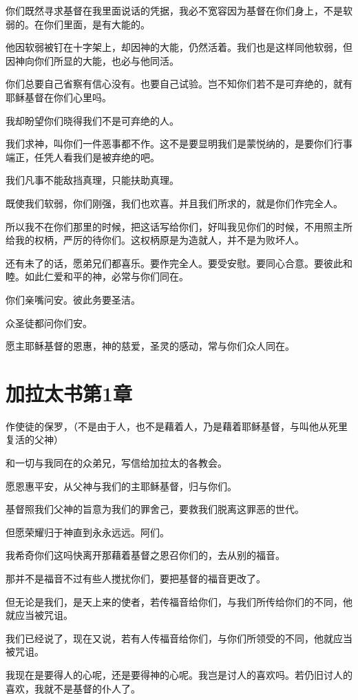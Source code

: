\documentclass[12pt,oneside]{book}
\begin{document}
你们既然寻求基督在我里面说话的凭据，我必不宽容因为基督在你们身上，不是软弱的。在你们里面，是有大能的。

他因软弱被钉在十字架上，却因神的大能，仍然活着。我们也是这样同他软弱，但因神向你们所显的大能，也必与他同活。

你们总要自己省察有信心没有。也要自己试验。岂不知你们若不是可弃绝的，就有耶稣基督在你们心里吗。

我却盼望你们晓得我们不是可弃绝的人。

我们求神，叫你们一件恶事都不作。这不是要显明我们是蒙悦纳的，是要你们行事端正，任凭人看我们是被弃绝的吧。

我们凡事不能敌挡真理，只能扶助真理。

既使我们软弱，你们刚强，我们也欢喜。并且我们所求的，就是你们作完全人。

所以我不在你们那里的时候，把这话写给你们，好叫我见你们的时候，不用照主所给我的权柄，严厉的待你们。这权柄原是为造就人，并不是为败坏人。

还有未了的话，愿弟兄们都喜乐。要作完全人。要受安慰。要同心合意。要彼此和睦。如此仁爱和平的神，必常与你们同在。

你们亲嘴问安。彼此务要圣洁。

众圣徒都问你们安。

愿主耶稣基督的恩惠，神的慈爱，圣灵的感动，常与你们众人同在。

\chapter{加拉太书第1章}
作使徒的保罗，（不是由于人，也不是藉着人，乃是藉着耶稣基督，与叫他从死里复活的父神）

和一切与我同在的众弟兄，写信给加拉太的各教会。

愿恩惠平安，从父神与我们的主耶稣基督，归与你们。

基督照我们父神的旨意为我们的罪舍己，要救我们脱离这罪恶的世代。

但愿荣耀归于神直到永永远远。阿们。

我希奇你们这吗快离开那藉着基督之恩召你们的，去从别的福音。

那并不是福音不过有些人搅扰你们，要把基督的福音更改了。

但无论是我们，是天上来的使者，若传福音给你们，与我们所传给你们的不同，他就应当被咒诅。

我们已经说了，现在又说，若有人传福音给你们，与你们所领受的不同，他就应当被咒诅。

我现在是要得人的心呢，还是要得神的心呢。我岂是讨人的喜欢吗。若仍旧讨人的喜欢，我就不是基督的仆人了。
\end{document}
